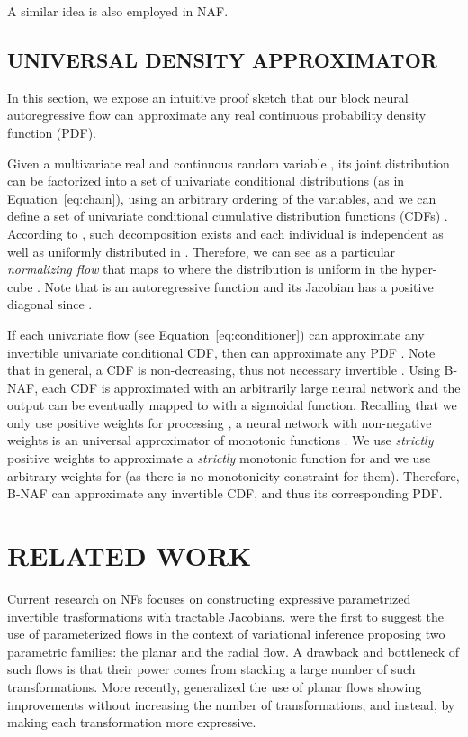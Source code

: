 \documentclass[letterpaper]{article}
\begin{document}
A similar idea is also employed in NAF.

\subsection{UNIVERSAL DENSITY APPROXIMATOR}
In this section, we expose an intuitive proof sketch that our block neural autoregressive flow can approximate any real continuous probability density function (PDF).

Given a multivariate real and continuous random variable , its joint distribution can be factorized into a set of univariate conditional distributions (as in Equation~\ref{eq:chain}), using an arbitrary ordering of the variables, and we can define a set of univariate conditional cumulative distribution functions (CDFs) . According to \citet{hyvarinen1999nonlinear}, such decomposition exists and each individual  is independent as well as uniformly distributed in . Therefore, we can see  as a particular \emph{normalizing flow} that maps  to  where the distribution  is uniform in the hyper-cube . Note that  is an autoregressive function and its Jacobian has a positive diagonal since .

If each univariate flow  (see Equation~\ref{eq:conditioner}) can approximate any invertible univariate conditional CDF, then  can approximate any PDF \citep{huang2018neural}. Note that in general, a CDF  is non-decreasing, thus not necessary invertible \citep{park2018fundamentals}. Using B-NAF, each CDF is approximated with an arbitrarily large neural network and the output can be eventually mapped to  with a sigmoidal function. Recalling that we only use positive weights for processing , a neural network with non-negative weights is an universal approximator of monotonic functions \citep{daniels2010monotone}. We use \emph{strictly} positive weights to approximate a \emph{strictly} monotonic function for  and we use arbitrary weights for  (as there is no monotonicity constraint for them). Therefore, B-NAF can approximate any invertible CDF, and thus its corresponding PDF.

\section{RELATED WORK}
Current research on NFs focuses on constructing expressive parametrized invertible trasformations with tractable Jacobians. \citet{rezende2015variational} were the first to suggest the use of parameterized flows in the context of variational inference proposing two parametric families: the planar and the radial flow. A drawback and bottleneck of such flows is that their power comes from stacking a large number of such transformations. More recently, \citet{berg2018sylvester} generalized the use of planar flows showing improvements without increasing the number of transformations, and instead, by making each transformation more expressive.
\end{document}
